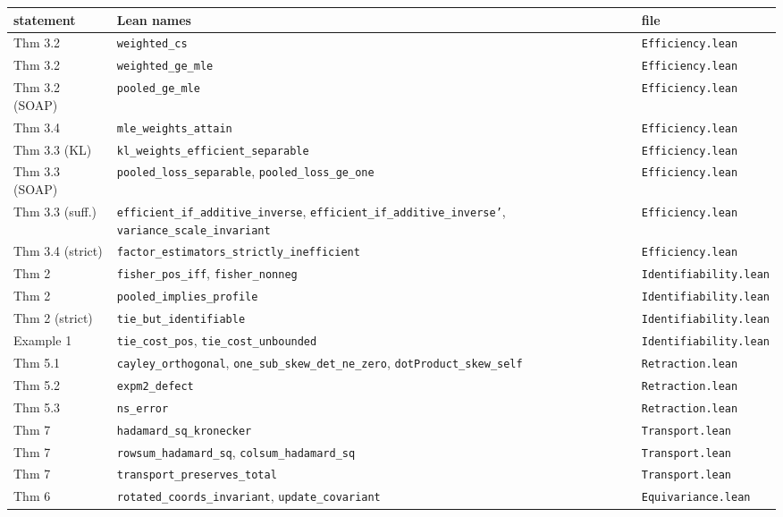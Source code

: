 \begin{tabular}{>{\raggedright\arraybackslash}p{2.6cm}>{\raggedright\arraybackslash}p{9.0cm}>{\raggedright\arraybackslash}p{3.2cm}}
\toprule
statement & Lean names & file \\
\midrule
Thm 3.2 & \texttt{weighted\_cs} & \texttt{Efficiency.lean} \\
Thm 3.2 & \texttt{weighted\_ge\_mle} & \texttt{Efficiency.lean} \\
Thm 3.2 (SOAP) & \texttt{pooled\_ge\_mle} & \texttt{Efficiency.lean} \\
Thm 3.4 & \texttt{mle\_weights\_attain} & \texttt{Efficiency.lean} \\
Thm 3.3 (KL) & \texttt{kl\_weights\_efficient\_separable} & \texttt{Efficiency.lean} \\
Thm 3.3 (SOAP) & \texttt{pooled\_loss\_separable}, \texttt{pooled\_loss\_ge\_one} & \texttt{Efficiency.lean} \\
Thm 3.3 (suff.) & \texttt{efficient\_if\_additive\_inverse}, \texttt{efficient\_if\_additive\_inverse'}, \texttt{variance\_scale\_invariant} & \texttt{Efficiency.lean} \\
Thm 3.4 (strict) & \texttt{factor\_estimators\_strictly\_inefficient} & \texttt{Efficiency.lean} \\
Thm 2 & \texttt{fisher\_pos\_iff}, \texttt{fisher\_nonneg} & \texttt{Identifiability.lean} \\
Thm 2 & \texttt{pooled\_implies\_profile} & \texttt{Identifiability.lean} \\
Thm 2 (strict) & \texttt{tie\_but\_identifiable} & \texttt{Identifiability.lean} \\
Example 1 & \texttt{tie\_cost\_pos}, \texttt{tie\_cost\_unbounded} & \texttt{Identifiability.lean} \\
Thm 5.1 & \texttt{cayley\_orthogonal}, \texttt{one\_sub\_skew\_det\_ne\_zero}, \texttt{dotProduct\_skew\_self} & \texttt{Retraction.lean} \\
Thm 5.2 & \texttt{expm2\_defect} & \texttt{Retraction.lean} \\
Thm 5.3 & \texttt{ns\_error} & \texttt{Retraction.lean} \\
Thm 7 & \texttt{hadamard\_sq\_kronecker} & \texttt{Transport.lean} \\
Thm 7 & \texttt{rowsum\_hadamard\_sq}, \texttt{colsum\_hadamard\_sq} & \texttt{Transport.lean} \\
Thm 7 & \texttt{transport\_preserves\_total} & \texttt{Transport.lean} \\
Thm 6 & \texttt{rotated\_coords\_invariant}, \texttt{update\_covariant} & \texttt{Equivariance.lean} \\

\end{tabular}
